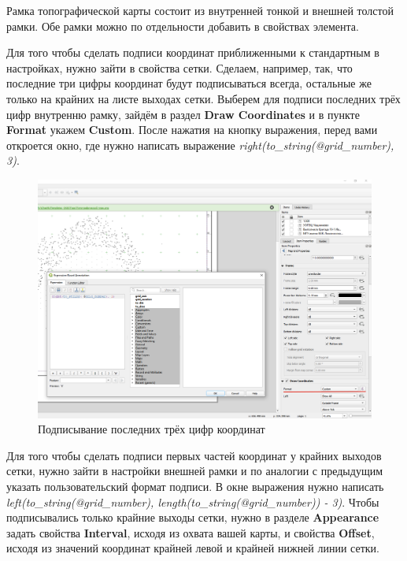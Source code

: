 \documentclass[
  12pt,
]{book}
\begin{document}
Рамка топографической карты состоит из внутренней тонкой и внешней толстой рамки. Обе рамки можно по отдельности добавить в свойствах элемента.

Для того чтобы сделать подписи координат приближенными к стандартным в настройках, нужно зайти в свойства сетки. Сделаем, например, так, что последние три цифры координат будут подписываться всегда, остальные же только на крайних на листе выходах сетки. Выберем для подписи последних трёх цифр внутренню рамку, зайдём в раздел \textbf{Draw Coordinates} и в пункте \textbf{Format} укажем \textbf{Custom}. После нажатия на кнопку выражения, перед вами откроется окно, где нужно написать выражение \emph{right(to\_string(@grid\_number), 3)}.

\begin{figure}
\centering
\includegraphics{images/Practice/Expression_label_last3.png}
\caption{Подписывание последних трёх цифр координат}
\end{figure}

Для того чтобы сделать подписи первых частей координат у крайних выходов сетки, нужно зайти в настройки внешней рамки и по аналогии с предыдущим указать пользовательский формат подписи. В окне выражения нужно написать \emph{left(to\_string(@grid\_number), length(to\_string(@grid\_number)) - 3)}. Чтобы подписывались только крайние выходы сетки, нужно в разделе \textbf{Appearance} задать свойства \textbf{Interval}, исходя из охвата вашей карты, и свойства \textbf{Offset}, исходя из значений координат крайней левой и крайней нижней линии сетки.
\end{document}

